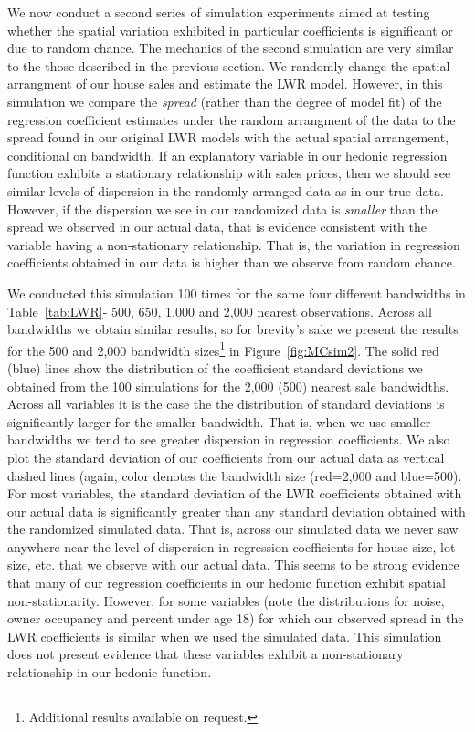 \documentclass{article}\usepackage{graphicx, color}
\begin{document}
We now conduct a second series of simulation experiments aimed at testing whether the spatial variation exhibited in particular coefficients is significant or due to random chance. The mechanics of the second simulation are very similar to the those described in the previous section. We randomly change the spatial arrangment of our house sales and estimate the LWR model. However, in this simulation we compare the \emph{spread} (rather than the degree of model fit) of the regression coefficient estimates under the random arrangment of the data to the spread found in our original LWR models with the actual spatial arrangement, conditional on bandwidth. If an explanatory variable in our hedonic regression function exhibits a stationary relationship with sales prices, then we should see similar levels of dispersion in the randomly arranged data as in our true data. However, if the dispersion we see in our randomized data is \emph{smaller} than the spread we observed in our actual data, that is evidence consistent with the variable having a non-stationary relationship. That is, the variation in regression coefficients obtained in our data is higher than we observe from random chance. 

We conducted this simulation 100 times for the same four different bandwidths in Table~\ref{tab:LWR}- 500, 650, 1,000 and 2,000 nearest observations. Across all bandwidths we obtain similar results, so for brevity's sake we present the results for the 500 and 2,000 bandwidth sizes\footnote{Additional results available on request.} in Figure~\ref{fig:MCsim2}. The solid red (blue) lines show the distribution of the coefficient standard deviations we obtained from the 100 simulations for the 2,000 (500) nearest sale bandwidths. Across all variables it is the case the the distribution of standard deviations is significantly larger for the smaller bandwidth. That is, when we use smaller bandwidths we tend to see greater dispersion in regression coefficients. We also plot the standard deviation of our coefficients from our actual data as vertical dashed lines (again, color denotes the bandwidth size (red=2,000 and blue=500). For most variables, the standard deviation of the LWR coefficients obtained with our actual data is significantly greater than any standard deviation obtained with the randomized simulated data. That is, across our simulated data we never saw anywhere near the level of dispersion in regression coefficients for house size, lot size, etc. that we observe with our actual data. This seems to be strong evidence that many of our regression coefficients in our hedonic function exhibit spatial non-stationarity. However, for some variables (note the distributions for noise, owner occupancy and percent under age 18) for which our observed spread in the LWR coefficients is similar when we used the simulated data. This simulation does not present evidence that these variables exhibit a non-stationary relationship in our hedonic function.
\end{document}
